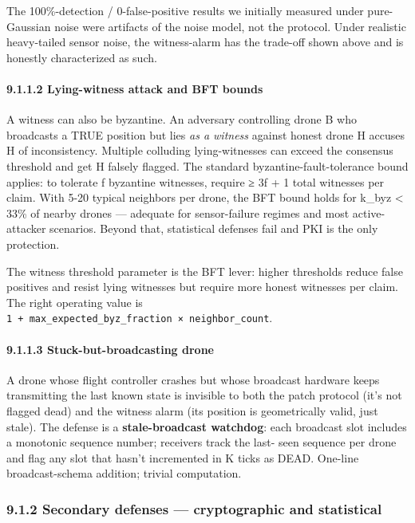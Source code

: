 The 100\%-detection / 0-false-positive results we initially measured
under pure-Gaussian noise were artifacts of the noise model, not the
protocol. Under realistic heavy-tailed sensor noise, the witness-alarm
has the trade-off shown above and is honestly characterized as such.

\paragraph{9.1.1.2 Lying-witness attack and BFT
bounds}\label{lying-witness-attack-and-bft-bounds}

A witness can also be byzantine. An adversary controlling drone B who
broadcasts a TRUE position but lies \emph{as a witness} against honest
drone H accuses H of inconsistency. Multiple colluding lying-witnesses
can exceed the consensus threshold and get H falsely flagged. The
standard byzantine-fault-tolerance bound applies: to tolerate f
byzantine witnesses, require ≥ 3f + 1 total witnesses per claim. With
5-20 typical neighbors per drone, the BFT bound holds for k\_byz
\textless{} 33\% of nearby drones --- adequate for sensor-failure
regimes and most active-attacker scenarios. Beyond that, statistical
defenses fail and PKI is the only protection.

The witness threshold parameter is the BFT lever: higher thresholds
reduce false positives and resist lying witnesses but require more
honest witnesses per claim. The right operating value is
\texttt{1\ +\ max\_expected\_byz\_fraction\ ×\ neighbor\_count}.

\paragraph{9.1.1.3 Stuck-but-broadcasting
drone}\label{stuck-but-broadcasting-drone}

A drone whose flight controller crashes but whose broadcast hardware
keeps transmitting the last known state is invisible to both the patch
protocol (it's not flagged dead) and the witness alarm (its position is
geometrically valid, just stale). The defense is a
\textbf{stale-broadcast watchdog}: each broadcast slot includes a
monotonic sequence number; receivers track the last- seen sequence per
drone and flag any slot that hasn't incremented in K ticks as DEAD.
One-line broadcast-schema addition; trivial computation.

\subsubsection{9.1.2 Secondary defenses --- cryptographic and
statistical}\label{secondary-defenses-cryptographic-and-statistical}


